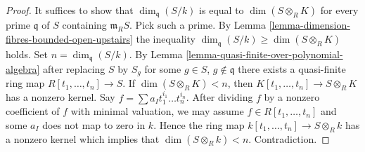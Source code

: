 \begin{proof}
It suffices to show that $\dim_{\mathfrak q}(S/k)$ is equal
to $\dim(S \otimes_R K)$ for every prime $\mathfrak q$ of
$S$ containing $\mathfrak m_RS$. Pick such a prime. By
Lemma \ref{lemma-dimension-fibres-bounded-open-upstairs}
the inequality $\dim_{\mathfrak q}(S/k) \geq \dim(S \otimes_R K)$
holds. Set $n = \dim_{\mathfrak q}(S/k)$. By
Lemma \ref{lemma-quasi-finite-over-polynomial-algebra}
after replacing $S$ by $S_g$ for some $g \in S$, $g \not \in \mathfrak q$
there exists a quasi-finite ring map
$R[t_1, \ldots, t_n] \to S$. If $\dim(S \otimes_R K) < n$,
then $K[t_1, \ldots, t_n] \to S \otimes_R K$ has a nonzero kernel.
Say $f = \sum a_I t_1^{i_1}\ldots t_n^{i_n}$. After dividing
$f$ by a nonzero coefficient of $f$ with minimal valuation, we may
assume $f\in R[t_1, \ldots, t_n]$ and some $a_I$ does not map
to zero in $k$. Hence the ring map $k[t_1, \ldots, t_n] \to S \otimes_R k$
has a nonzero kernel which implies that $\dim(S \otimes_R k) < n$.
Contradiction.
\end{proof}
























